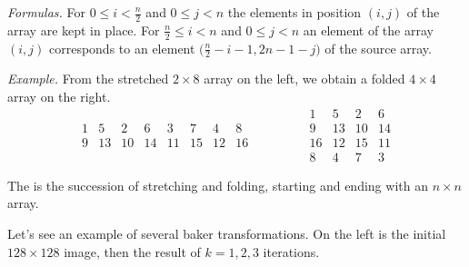 \documentclass[11pt,class=report,crop=false]{standalone}
\begin{document}
\begin{cours}
\begin{itemize}
\emph{Formulas.} 
For $0 \le i < \frac n2$ and $0 \le j < n$ the elements in position $(i,j)$ of the array are kept in place.
For $\frac n2 \le i < n$ and $0 \le j < n$ an element of the array 
$(i,j)$ corresponds to an element $\big(\frac{n}{2} - i - 1,2n-1-j\big)$ of the source array. 


\emph{Example.} 
From the stretched $2 \times 8$ array on the left, we obtain a folded $4 \times 4$ array on the right. 
$$ 
\begin{array}{cccccccc} 
  1& 5& 2& 6& 3& 7& 4& 8  \\
  9&13&10&14&11&15&12&16
\end{array}\qquad\qquad
\begin{array}{cccc} 
  1& 5& 2& 6\\ 
  9& 13& 10& 14\\  
  16&12&15&11\\  
  8&4&7&3  
\end{array}$$
\end{itemize}


The  is the succession of stretching and folding, starting and ending with an $n \times n$ array.


Let's see an example of several baker transformations.
On the left is the initial $128 \times 128$ image, then the result of $k=1,2,3$ iterations. 


\end{cours}
\end{document}
